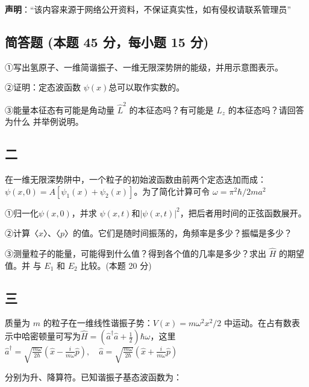
\textbf{声明}：“该内容来源于网络公开资料，不保证真实性，如有侵权请联系管理员”

\subsection{简答题 (本题 45 分，每小题 15 分)}
①写出氢原子、一维简谐振子、一维无限深势阱的能级，并用示意图表示。

②证明：定态波函数 $\psi(x)$总可以取作实数的。

③能量本征态有可能是角动量 $\hat{L}^2$ 的本征态吗？有可能是 $\hat{L}_z$ 的本征态吗？请回答为什么
并举例说明。

\subsection{二}
在一维无限深势阱中，一个粒子的初始波函数由前两个定态迭加而成：$\psi(x,0)=A[\psi_1 (x)
+\psi_2 (x)]$。为了简化计算可令 $\omega=\pi^2\hbar/2ma^2$

①归一化$\psi(x,0)$，并求 $\psi(x,t)$和$|\psi(x,t)|^2$，把后者用时间的正弦函数展开。

②计算〈$x$〉、〈$p$〉的值。它们是随时间振荡的，角频率是多少？振幅是多少？

③测量粒子的能量，可能得到什么值？得到各个值的几率是多少？求出 $\hat{H}$ 的期望值。并
与 $E_1$ 和 $E_2$ 比较。(本题 20 分)

\subsection{三}
质量为 $m$ 的粒子在一维线性谐振子势：$V(x)=m\omega^2x^2/2$ 中运动。在占有数表示中哈密顿量可写为$\hat{H} = \left(\hat{a}^\dagger \hat{a} + \frac{1}{2}\right)\hbar\omega$，这里 
$\hat{a}^\dagger = \sqrt{\frac{m\omega}{2\hbar}} \left( \hat{x} - \frac{i}{m\omega} \hat{p} \right), \quad \hat{a} = \sqrt{\frac{m\omega}{2\hbar}} \left( \hat{x} + \frac{i}{m\omega} \hat{p} \right)$

分别为升、降算符。已知谐振子基态波函数为：
